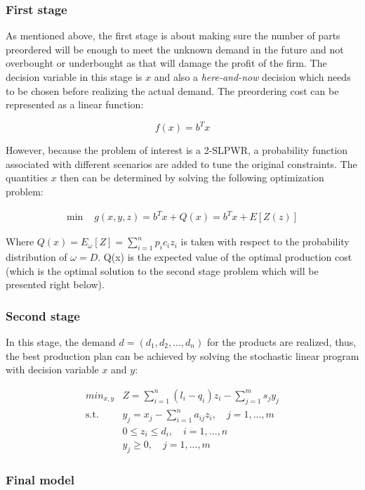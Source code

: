 		\subsubsection{First stage}
		\qquad As mentioned above, the first stage is about making sure the number of parts preordered will be enough to meet the unknown demand in the future and not overbought or underbought as that will damage the profit of the firm. The decision variable in this stage is $x$ and also a \textit{here-and-now} decision which needs to be chosen before realizing the actual demand. The preordering cost can be represented as a linear function:
		
		$$f(x) = b^Tx$$
		
		However, because the problem of interest is a 2-SLPWR, a probability function associated with different scenarios are added to tune the original constraints. The quantities $x$ then can be determined by solving the following optimization problem:

		\begin{align*}
			\text{min } & g(x,y,z) = b^Tx + Q(x) = b^Tx + E[Z(z)]
		\end{align*}

		Where $Q(x) = E_\omega[Z] = \sum_{i=1}^{n}p_i c_i z_i$ is taken with respect to the probability distribution of $\omega = D$. Q(x) is the expected value of the optimal production cost (which is the optimal solution to the second stage problem which will be presented right below).

		\subsubsection{Second stage}

		\qquad In this stage, the demand $d=(d_1,d_2,...,d_n)$ for the products are realized, thus, the best production plan can be achieved by solving the stochastic linear program with decision variable $x$ and $y$:

		\begin{align*}
			min_{x,y} & Z=\sum^n_{i=1} (l_i-q_i)z_i - \sum^m_{j=1}s_jy_j \\
			\text{s.t. } & y_j=x_j- \sum_{i=1}^n a_{ij}z_i, \quad j=1,...,m \\
			& 0 \leq z_i \leq d_i, \quad i=1,...,n \\
			& y_j \geq 0, \quad j=1,...,m
		\end{align*}
		
		\subsubsection{Final model}
